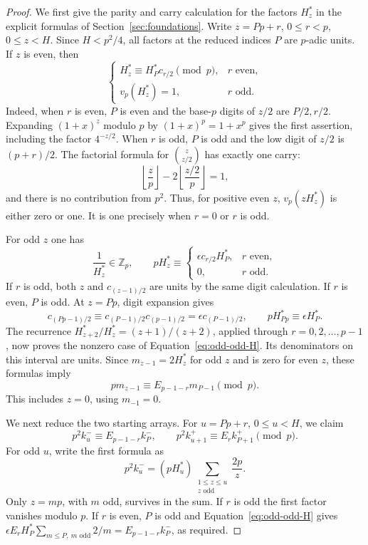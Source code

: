 \begin{proof}
We first give the parity and carry calculation for the factors $H_z^*$
in the explicit formulas of Section~\ref{sec:foundations}.  Write
$z=Pp+r$, $0\le r<p$, $0\le z<H$.  Since $H<p^2/4$, all factors at
the reduced indices $P$ are $p$-adic units.  If $z$ is even, then
\begin{equation}\label{eq:odd-even-H}
 \begin{cases}
 H_z^*\equiv H_P^*c_{r/2}\pmod p,&r\text{ even},\\
 v_p(H_z^*)=1,&r\text{ odd}.
 \end{cases}
\end{equation}
Indeed, when $r$ is even, $P$ is even and the base-$p$ digits of $z/2$
are $P/2,r/2$.  Expanding $(1+x)^z$ modulo $p$ by
$(1+x)^p=1+x^p$ gives the first assertion, including the factor $4^{-z/2}$.
When $r$ is odd, $P$ is odd and the low digit of $z/2$ is $(p+r)/2$.
The factorial formula for $\binom z{z/2}$ has exactly one carry:
\[
 \left\lfloor\frac zp\right\rfloor
       -2\left\lfloor\frac{z/2}{p}\right\rfloor=1,
\]
and there is no contribution from $p^2$.  Thus, for positive even $z$,
$v_p(zH_z^*)$ is either zero or one.  It is one precisely when $r=0$
or $r$ is odd.

For odd $z$ one has
\begin{equation}\label{eq:odd-odd-H}
 \frac1{H_z^*}\in\mathbb Z_p,\qquad
 pH_z^*\equiv
 \begin{cases}
 \epsilon c_{r/2}H_P^*,&r\text{ even},\\
 0,&r\text{ odd}.
 \end{cases}
\end{equation}
If $r$ is odd, both $z$ and $c_{(z-1)/2}$ are units by the same
digit calculation.  If $r$ is even, $P$ is odd.  At $z=Pp$, digit
expansion gives
\[
 c_{(Pp-1)/2}\equiv c_{(P-1)/2}c_{(p-1)/2}
       =\epsilon c_{(P-1)/2},
 \qquad pH_{Pp}^*\equiv\epsilon H_P^*.
\]
The recurrence $H_{z+2}^*/H_z^*=(z+1)/(z+2)$, applied through
$r=0,2,\ldots,p-1$, now proves the nonzero case of
Equation~\eqref{eq:odd-odd-H}.  Its denominators on this interval are
units.  Since $m_{z-1}=2H_z^*$ for odd $z$ and is zero for even $z$,
these formulas imply
\begin{equation}\label{eq:odd-moment-digit}
 pm_{z-1}\equiv E_{p-1-r}m_{P-1}\pmod p.
\end{equation}
This includes $z=0$, using $m_{-1}=0$.

We next reduce the two starting arrays.  For $u=Pp+r$, $0\le u<H$,
we claim
\begin{equation}\label{eq:odd-starting-digits}
 p^2k^-_u\equiv E_{p-1-r}k^-_P,
 \qquad
 p^2k^+_{u+1}\equiv E_r k^+_{P+1}\pmod p.
\end{equation}
For odd $u$, write the first formula as
\[
 p^2 k^-_u=(pH_u^*)
           \sum_{\substack{1\le z\le u\\z\text{ odd}}}\frac{2p}{z}.
\]
Only $z=mp$, with $m$ odd, survives in the sum.  If $r$ is odd the
first factor vanishes modulo $p$.  If $r$ is even, $P$ is odd and
Equation~\eqref{eq:odd-odd-H} gives
$\epsilon E_rH_P^*\sum_{m\le P,\ m\text{ odd}}2/m
 =E_{p-1-r}k^-_P$, as required.


\end{proof}
